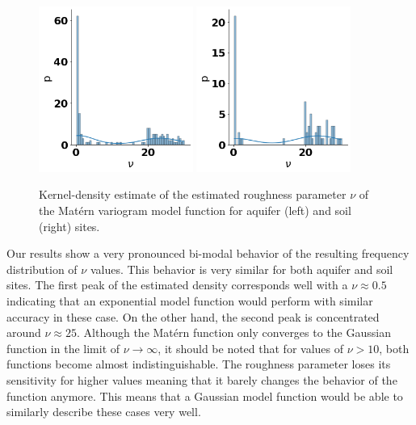 \documentclass{article}
\begin{document}
\begin{figure}[ht]
    \includegraphics[width=0.45\textwidth]{fig/nu_aquifer_matern_kde.png}
    \includegraphics[width=0.45\textwidth]{fig/nu_soil_matern_kde.png}
    \caption{Kernel-density estimate of the estimated roughness parameter $\nu$ of the Mat{\'e}rn variogram model function for aquifer (left) and soil (right) sites.}
    \label{fig:nu_matern}
\end{figure}

Our results show a very pronounced bi-modal behavior of the resulting frequency distribution of $\nu$ values. This behavior is very similar for both aquifer and soil sites. The first peak of the estimated density corresponds well with a $\nu \approx 0.5$ indicating that an exponential model function would perform with similar accuracy in these case. On the other hand, the second peak is concentrated around $\nu \approx 25$. Although the Mat{\'e}rn function only converges to the Gaussian function in the limit of $\nu \rightarrow \infty$, it should be noted that for values of $\nu>10$, both functions become almost indistinguishable. The roughness parameter loses its sensitivity for higher values meaning that it barely changes the behavior of the function anymore. This means that a Gaussian model function would be able to similarly describe these cases very well.
\end{document}
